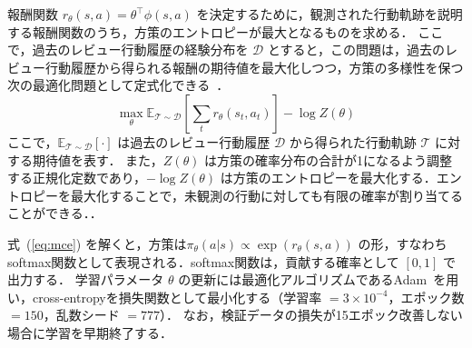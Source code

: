 \documentclass[submit,noauthor,ses,dvipdfmx]{ipsj}
\begin{document}
報酬関数 $r_\theta(s,a) = \theta^\top \phi(s,a)$ を決定するために，観測された行動軌跡を説明する報酬関数のうち，方策のエントロピーが最大となるものを求める．
ここで，過去のレビュー行動履歴の経験分布を $\mathcal{D}$ とすると，この問題は，過去のレビュー行動履歴から得られる報酬の期待値を最大化しつつ，方策の多様性を保つ次の最適化問題として定式化できる~\cite{ziebart}．
\begin{equation}
\max_\theta \mathbb{E}_{\mathcal{T} \sim \mathcal{D}}
\left[\sum_t r_\theta(s_t, a_t)\right] - \log Z(\theta)
\label{eq:mce}
\end{equation}
ここで，$\mathbb{E}_{\mathcal{T} \sim \mathcal{D}}[\cdot]$ は過去のレビュー行動履歴 $\mathcal{D}$ から得られた行動軌跡 $\mathcal{T}$ に対する期待値を表す．
また，$Z(\theta)$ は方策の確率分布の合計が1になるよう調整する正規化定数であり，$-\log Z(\theta)$ は方策のエントロピーを最大化する．エントロピーを最大化することで，未観測の行動に対しても有限の確率が割り当てることができる．．

式~(\ref{eq:mce}) を解くと，方策は$\pi_\theta(a|s) \propto \exp(r_\theta(s,a))$ の形，すなわちsoftmax関数として表現される．softmax関数は，貢献する確率として $[0, 1]$ で出力する．
学習パラメータ $\theta$ の更新には最適化アルゴリズムであるAdam~\cite{kingma2015adam}を用い，cross-entropyを損失関数として最小化する（学習率 $= 3\times10^{-4}$，エポック数 $= 150$，乱数シード $= 777$）．
なお，検証データの損失が15エポック改善しない場合に学習を早期終了する．







\end{document}
